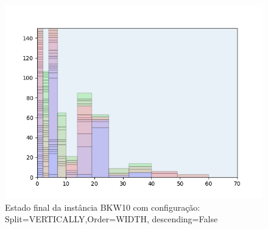 \begin{figure}[H]
    \centering
    \caption[]{Estado final da instância BKW10 com configuração: Split=VERTICALLY,Order=WIDTH, descending=False}
    \label{fig:bkw10-vertically-width-false}
    \includegraphics[scale=0.5]{output/figures/bkw/bkw10/vertically/width/false/000}
\end{figure}